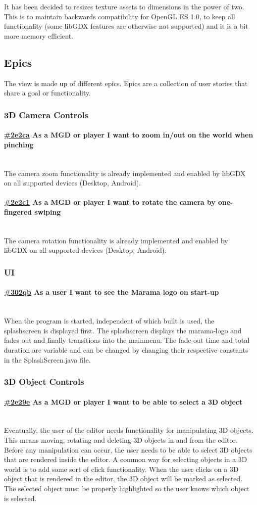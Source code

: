 \documentclass[10pt]{extarticle} %
\newcommand{\myparagraph}[1]{\paragraph{#1}\mbox{}\\} %
\begin{document}
    It has been decided to resizes texture assets to dimensions in the power of two.
    This is to maintain backwards compatibility for OpenGL ES 1.0, to keep all functionality (some libGDX features are otherwise not supported) and it is a bit more memory efficient.\cite{libgdxpottex}

    \subsection{Epics}
    The view is made up of different epics.
    Epics are a collection of user stories that share a goal or functionality.

    \subsubsection{3D Camera Controls}
    \myparagraph{\href{https://app.clickup.com/757520/761304/t/2e2ca}{\#2e2ca} As a MGD or player I want to zoom in/out on the world when pinching}
    The camera zoom functionality is already implemented and enabled by libGDX on all supported devices (Desktop, Android).
    \myparagraph{\href{https://app.clickup.com/757520/761304/t/2e2c1}{\#2e2c1} As a MGD or player I want to rotate the camera by one-fingered swiping}
    The camera rotation functionality is already implemented and enabled by libGDX on all supported devices (Desktop, Android).

    \subsubsection{UI}
    \myparagraph{\href{https://app.clickup.com/757520/761304/t/302qb}{\#302qb} As a user I want to see the Marama logo on start-up}
    When the program is started, independent of which built is used, the splashscreen is displayed first.
    The splashscreen displays the marama-logo and fades out and finally transitions into the mainmenu.
    The fade-out time and total duration are variable and can be changed by changing their respective constants in the SplashScreen.java file.

    \subsubsection{3D Object Controls}
    \myparagraph{\href{https://app.clickup.com/757520/761304/t/2e29e}{\#2e29e} As a MGD or player I want to be able to select a 3D object}
    Eventually, the user of the editor needs functionality for manipulating 3D objects.
    This means moving, rotating and deleting 3D objects in and from the editor.
    Before any manipulation can occur, the user needs to be able to select 3D objects that are rendered inside the editor.
    A common way for selecting objects in a 3D world is to add some sort of click functionality.
    When the user clicks on a 3D object that is rendered in the editor, the 3D object will be marked as selected.
    The selected object must be properly highlighted so the user knows which object is selected.
\end{document}
